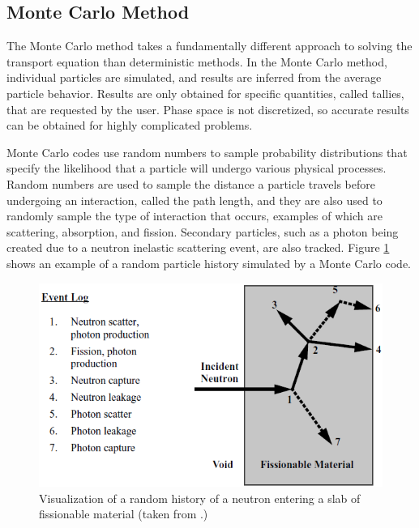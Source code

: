 \subsection{Monte Carlo Method}
\label{sec:bg:rt:mc}

The Monte Carlo method takes a fundamentally different approach to solving the transport equation than deterministic methods.
In the Monte Carlo method, individual particles are simulated, and results are inferred from the average particle behavior.
Results are only obtained for specific quantities, called tallies, that are requested by the user.
Phase space is not discretized, so accurate results can be obtained for highly complicated problems.

Monte Carlo codes use random numbers to sample probability distributions that specify the likelihood that a particle will undergo various physical processes.
Random numbers are used to sample the distance a particle travels before undergoing an interaction, called the path length, and they are also used to randomly sample the type of interaction that occurs, examples of which are scattering, absorption, and fission.
Secondary particles, such as a photon being created due to a neutron inelastic scattering event, are also tracked.
Figure \ref{fig:bg:monte-carlo} shows an example of a random particle history simulated by a Monte Carlo code. 

\begin{figure}[h!]
  \centering
  \includegraphics[width=1.0\textwidth]{content/background/monte_carlo.png}
  \caption{Visualization of a random history of a neutron entering a slab of fissionable material (taken from \cite{mcnp5_vol1}.)}
  \label{fig:bg:monte-carlo}
\end{figure}

